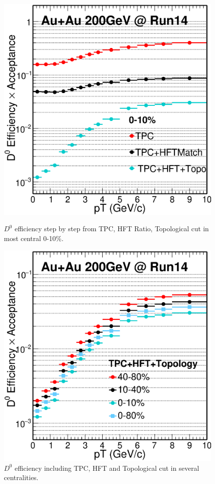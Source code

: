 \begin{figure}[htbp]
\begin{minipage}[htbp]{0.52\linewidth}
\centering
\includegraphics[width=1.0\textwidth,angle=0]{figure/Run14_D0HFT/HFT_efficiencyCombineStepbyStep_2.eps}
\caption{ $D^0$ efficiency step by step from TPC, HFT Ratio, Topological cut in most central 0-10\%. \label{D0effStep}}
\end{minipage}
\hfill
\begin{minipage}[htbp]{0.52\linewidth}
\centering
\includegraphics[width=1.0\textwidth,angle=0]{figure/Run14_D0HFT/HFT_efficiencyCombineCompare_5.eps} 
\caption{ $D^0$ efficiency including TPC, HFT and Topological cut in several centralities. \label{D0effCombine}}
\end{minipage}
\end{figure}

